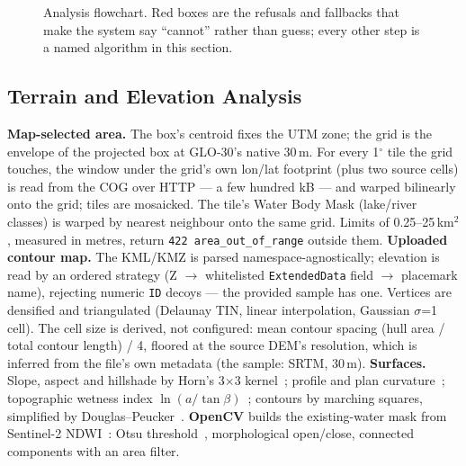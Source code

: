\documentclass[manuscript,screen,review]{acmart}
\begin{document}
\begin{figure}[h]
{}
\caption{Analysis flowchart. Red boxes are the refusals and fallbacks that make the system
say ``cannot'' rather than guess; every other step is a named algorithm in this section.}
\label{fig:decision}
\end{figure}

\subsection{Terrain and Elevation Analysis}
\textbf{Map-selected area.} The box's centroid fixes the UTM zone; the grid is the envelope of
the projected box at GLO-30's native 30\,m. For every 1$^\circ$ tile the grid touches, the
window under the grid's own lon/lat footprint (plus two source cells) is read from the COG
over HTTP --- a few hundred kB --- and warped bilinearly onto the grid; tiles are mosaicked.
The tile's Water Body Mask (lake/river classes) is warped by nearest neighbour onto the same
grid. Limits of 0.25--25\,km$^2$, measured in metres, return \texttt{422 area\_out\_of\_range}
outside them.
\textbf{Uploaded contour map.} The KML/KMZ is parsed namespace-agnostically; elevation is
read by an ordered strategy (Z $\rightarrow$ whitelisted \texttt{ExtendedData} field
$\rightarrow$ placemark name), rejecting numeric \texttt{ID} decoys --- the provided sample
has one. Vertices are densified and triangulated (Delaunay TIN, linear interpolation,
Gaussian $\sigma$=1 cell). The cell size is derived, not configured: mean contour spacing
(hull area / total contour length) / 4, floored at the source DEM's resolution, which is
inferred from the file's own metadata (the sample: SRTM, 30\,m).
\textbf{Surfaces.} Slope, aspect and hillshade by Horn's 3$\times$3 kernel~\cite{horn1981};
profile and plan curvature~\cite{zevenbergen1987}; topographic wetness index
$\ln(a/\tan\beta)$~\cite{beven1979}; contours by marching squares, simplified by
Douglas--Peucker~\cite{douglas1973}. \textbf{OpenCV} builds the existing-water mask from
Sentinel-2 NDWI~\cite{mcfeeters1996}: Otsu threshold~\cite{otsu1979}, morphological
open/close, connected components with an area filter.
\end{document}
